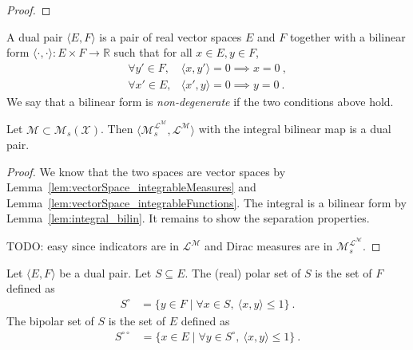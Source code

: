 \begin{proof}

\end{proof}


\begin{definition}\label{def:dualPair}
  \mathlibok
  A dual pair $\langle E, F \rangle$ is a pair of real vector spaces $E$ and $F$ together with a bilinear form $\langle \cdot, \cdot \rangle : E \times F \to \mathbb{R}$ such that for all $x \in E, y \in F$,
  \begin{align*}
    \forall y' \in F, &\langle x, y' \rangle = 0 \implies x = 0
    \: , \\
    \forall x' \in E, &\langle x', y \rangle = 0 \implies y = 0
    \: .
  \end{align*}
  We say that a bilinear form is \emph{non-degenerate} if the two conditions above hold.
\end{definition}


\begin{lemma}\label{lem:dualPair_integrable}
Let $\mathcal{M} \subset \mathcal{M}_s(\mathcal{X})$.
Then $\langle \mathcal{M}_s^{\mathcal{L}^{\mathcal{M}}}, \mathcal{L}^{\mathcal{M}} \rangle$ with the integral bilinear map is a dual pair.
\end{lemma}

\begin{proof}
  We know that the two spaces are vector spaces by Lemma~\ref{lem:vectorSpace_integrableMeasures} and Lemma~\ref{lem:vectorSpace_integrableFunctions}.
  The integral is a bilinear form by Lemma~\ref{lem:integral_bilin}.
  It remains to show the separation properties.

  TODO: easy since indicators are in $\mathcal{L}^{\mathcal{M}}$ and Dirac measures are in $\mathcal{M}_s^{\mathcal{L}^{\mathcal{M}}}$.
\end{proof}


\begin{definition}\label{def:polarSet}
  \leanok
Let $\langle E, F \rangle$ be a dual pair. Let $S \subseteq E$. The (real) polar set of $S$ is the set of $F$ defined as
\begin{align*}
  S^\circ
  &= \{y \in F \mid \forall x \in S, \: \langle x, y \rangle \le 1\}
  \: .
\end{align*}
The bipolar set of $S$ is the set of $E$ defined as
\begin{align*}
  S^{\circ\circ}
  &= \{x \in E \mid \forall y \in S^\circ, \: \langle x, y \rangle \le 1\}
  \: .
\end{align*}
\end{definition}


